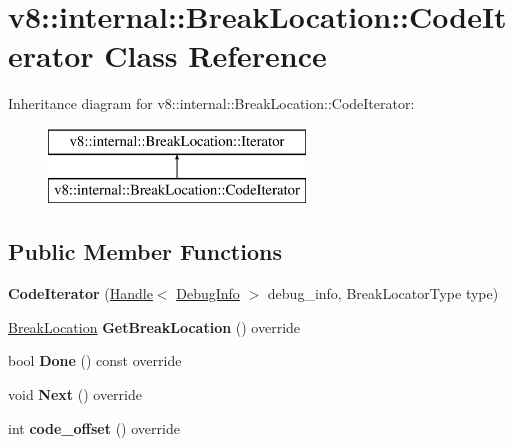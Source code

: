 \hypertarget{classv8_1_1internal_1_1_break_location_1_1_code_iterator}{}\section{v8\+:\+:internal\+:\+:Break\+Location\+:\+:Code\+Iterator Class Reference}
\label{classv8_1_1internal_1_1_break_location_1_1_code_iterator}
Inheritance diagram for v8\+:\+:internal\+:\+:Break\+Location\+:\+:Code\+Iterator\+:\begin{figure}[H]
\begin{center}
\leavevmode
\includegraphics[height=2.000000cm]{classv8_1_1internal_1_1_break_location_1_1_code_iterator}
\end{center}
\end{figure}
\subsection*{Public Member Functions}
\begin{DoxyCompactItemize}
\item 
{\bfseries Code\+Iterator} (\hyperlink{classv8_1_1internal_1_1_handle}{Handle}$<$ \hyperlink{classv8_1_1internal_1_1_debug_info}{Debug\+Info} $>$ debug\+\_\+info, Break\+Locator\+Type type)\hypertarget{classv8_1_1internal_1_1_break_location_1_1_code_iterator_ad4fdff6572096756d949afc156058aef}{}\label{classv8_1_1internal_1_1_break_location_1_1_code_iterator_ad4fdff6572096756d949afc156058aef}

\item 
\hyperlink{classv8_1_1internal_1_1_break_location}{Break\+Location} {\bfseries Get\+Break\+Location} () override\hypertarget{classv8_1_1internal_1_1_break_location_1_1_code_iterator_a64ff74919864a954256eaa1b9ab78453}{}\label{classv8_1_1internal_1_1_break_location_1_1_code_iterator_a64ff74919864a954256eaa1b9ab78453}

\item 
bool {\bfseries Done} () const  override\hypertarget{classv8_1_1internal_1_1_break_location_1_1_code_iterator_af4b5562a1c42c6827302e5a58f547d95}{}\label{classv8_1_1internal_1_1_break_location_1_1_code_iterator_af4b5562a1c42c6827302e5a58f547d95}

\item 
void {\bfseries Next} () override\hypertarget{classv8_1_1internal_1_1_break_location_1_1_code_iterator_a00b7fbe7b65f9b251da6a19651dd6e97}{}\label{classv8_1_1internal_1_1_break_location_1_1_code_iterator_a00b7fbe7b65f9b251da6a19651dd6e97}

\item 
int {\bfseries code\+\_\+offset} () override\hypertarget{classv8_1_1internal_1_1_break_location_1_1_code_iterator_a5076c2414ea20a8f297b136a95c01179}{}\label{classv8_1_1internal_1_1_break_location_1_1_code_iterator_a5076c2414ea20a8f297b136a95c01179}

\end{DoxyCompactItemize}
